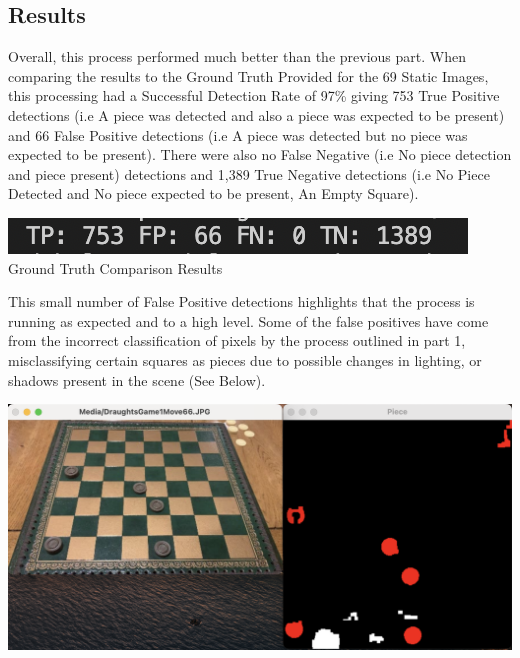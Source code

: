 \documentclass[11pt]{article}
\begin{document}
    \subsection{Results}
    \par
    Overall, this process performed much better than the previous part. When comparing the results to the Ground Truth Provided for the 69 Static Images, this processing had a Successful Detection Rate of 97\% giving 753 True Positive detections (i.e A piece was detected and also a piece was
    expected to be present) and 66 False Positive detections (i.e A piece was detected but no piece was expected to be present). There were also no False Negative (i.e No piece detection and piece present) detections and 1,389 True Negative detections (i.e No Piece Detected and No piece expected 
    to be present, An Empty Square).
    \begin{center}
        \includegraphics[scale=1]{AssignPt2Res.png}
        \newline
        Ground Truth Comparison Results
    \end{center}
    \par
    This small number of False Positive detections highlights that the process is running as expected and to a high level. Some of the false positives have come from the incorrect classification of pixels by the process outlined in part 1, misclassifying certain squares as pieces due to possible 
    changes in lighting, or shadows present in the scene (See Below).
    \begin{center}
        \includegraphics[scale=0.2]{FPExample.png}
        \newline
    \end{center}
\end{document}

